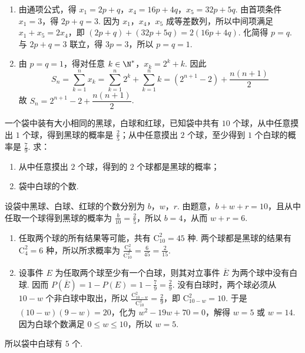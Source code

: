 \begin{solution}
\begin{enumerate}
\item 由通项公式，得 \(x_1=2p+q\)，\(x_4=16p+4q\)，\(x_5=32p+5q\). 由首项条件 \(x_1=3\)，得 \(2p+q=3\). 因为 \(x_1\)，\(x_4\)，\(x_5\) 成等差数列，所以中间项满足 \(x_1+x_5=2x_4\)，即 \((2p+q)+(32p+5q)=2(16p+4q)\). 化简得 \(p=q\). 与 \(2p+q=3\) 联立，得 \(3p=3\)，所以 \(p=q=1\).

\item 由 \(p=q=1\)，得对任意 \(k\in\N^*\)，\(x_k=2^k+k\). 因此
\[
S_n=\sum_{k=1}^{n}x_k=\sum_{k=1}^{n}2^k+\sum_{k=1}^{n}k=(2^{n+1}-2)+\frac{n(n+1)}{2}
\]
故 \(S_n=2^{n+1}-2+\dfrac{n(n+1)}{2}\).
\end{enumerate}
\end{solution}

\begin{problem}
一个袋中装有大小相同的黑球，白球和红球，已知袋中共有 \(10\) 个球，从中任意摸出 \(1\) 个球，得到黑球的概率是 \(\frac{2}{5}\)；从中任意摸出 \(2\) 个球，至少得到 \(1\) 个白球的概率是 \(\frac{7}{9}\). 求：

\begin{enumerate}
\item 从中任意摸出 \(2\) 个球，得到的 \(2\) 个球都是黑球的概率；
\item 袋中白球的个数.
\end{enumerate}
\end{problem}

\begin{solution}
设袋中黑球、白球、红球的个数分别为 \(b\)，\(w\)，\(r\). 由题意，\(b+w+r=10\)，且从中任取一个球得到黑球的概率为 \(\frac{b}{10}=\frac25\)，所以 \(b=4\)，从而 \(w+r=6\).

\begin{enumerate}
\item 任取两个球的所有结果等可能，共有 \(\mathrm C_{10}^{2}=45\) 种. 两个球都是黑球的结果有 \(\mathrm C_{4}^{2}=6\) 种，所以所求概率为 \(\frac{\mathrm C_4^2}{\mathrm C_{10}^2}=\frac6{45}=\frac2{15}\).

\item 设事件 \(E\) 为任取两个球至少有一个白球，则其对立事件 \(\overline E\) 为两个球中没有白球. 因而 \(P(\overline E)=1-P(E)=1-\frac79=\frac29\). 没有白球时，两个球必须从 \(10-w\) 个非白球中取出，所以 \(\frac{\mathrm C_{10-w}^{2}}{\mathrm C_{10}^{2}}=\frac29\)，即 \(\mathrm C_{10-w}^{2}=10\). 于是 \((10-w)(9-w)=20\)，化为 \(w^2-19w+70=0\)，解得 \(w=5\) 或 \(w=14\). 因为白球个数满足 \(0\leqslant w\leqslant10\)，所以 \(w=5\).
\end{enumerate}
所以袋中白球有 \(5\) 个.
\end{solution}

